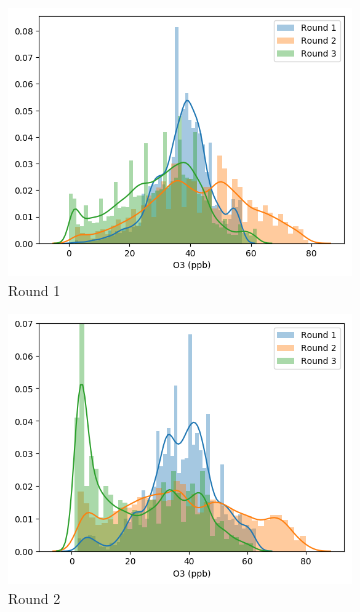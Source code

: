 \documentclass[journal abbreviation, manuscript]{copernicus}
\begin{document}
\begin{figure}[H]
\centering
\begin{subfigure}{0.32\textwidth}
\includegraphics[width=\textwidth]{results/distributions/location_donovan_o3.png}
\caption{Round 1}
\end{subfigure}
\begin{subfigure}{0.32\textwidth}
\includegraphics[width=\textwidth]{results/distributions/location_elcajon_o3.png}
\caption{Round 2}
\end{subfigure}
\begin{subfigure}{0.32\textwidth}

\end{subfigure}
\end{figure}
\end{document}
